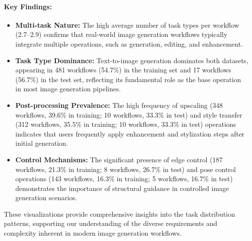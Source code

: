 \documentclass[runningheads]{llncs}
\begin{document}
\paragraph{Key Findings:}

\begin{itemize}
    \item \textbf{Multi-task Nature:} The high average number of task types per workflow (2.7--2.9) confirms that real-world image generation workflows typically integrate multiple operations, such as generation, editing, and enhancement.
    
    \item \textbf{Task Type Dominance:} Text-to-image generation dominates both datasets, appearing in 481 workflows (54.7\%) in the training set and 17 workflows (56.7\%) in the test set, reflecting its fundamental role as the base operation in most image generation pipelines.
    
    \item \textbf{Post-processing Prevalence:} The high frequency of upscaling (348 workflows, 39.6\% in training; 10 workflows, 33.3\% in test) and style transfer (312 workflows, 35.5\% in training; 10 workflows, 33.3\% in test) operations indicates that users frequently apply enhancement and stylization steps after initial generation.
    
    \item \textbf{Control Mechanisms:} The significant presence of edge control (187 workflows, 21.3\% in training; 8 workflows, 26.7\% in test) and pose control operations (143 workflows, 16.3\% in training; 5 workflows, 16.7\% in test) demonstrates the importance of structural guidance in controlled image generation scenarios.
\end{itemize}

These visualizations provide comprehensive insights into the task distribution patterns, supporting our understanding of the diverse requirements and complexity inherent in modern image generation workflows.
\end{document}
